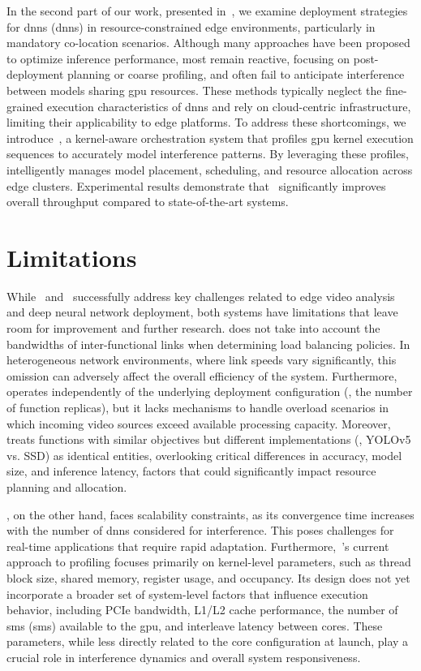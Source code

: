 In the second part of our work, presented in~, we examine deployment strategies for \acrlong{dnn}s (\acrshort{dnn}s) in resource-constrained edge environments, particularly in mandatory co-location scenarios. Although many approaches have been proposed to optimize inference performance, most remain reactive, focusing on post-deployment planning or coarse profiling, and often fail to anticipate interference between models sharing \acrshort{gpu} resources. These methods typically neglect the fine-grained execution characteristics of \acrshort{dnn}s and rely on cloud-centric infrastructure, limiting their applicability to edge platforms. To address these shortcomings, we introduce~\roomie{}, a kernel-aware orchestration system that profiles \acrshort{gpu} kernel execution sequences to accurately model interference patterns. By leveraging these profiles,~\roomie{} intelligently manages model placement, scheduling, and resource allocation across edge clusters. Experimental results demonstrate that~\roomie{} significantly improves overall throughput compared to state-of-the-art systems.

\section{Limitations}

While~\videojam{} and~\roomie{} successfully address key challenges related to edge video analysis and deep neural network deployment, both systems have limitations that leave room for improvement and further research.
\videojam{} does not take into account the bandwidths of inter-functional links when determining load balancing policies. In heterogeneous network environments, where link speeds vary significantly, this omission can adversely affect the overall efficiency of the system. Furthermore,~\videojam{} operates independently of the underlying deployment configuration (\eg, the number of function replicas), but it lacks mechanisms to handle overload scenarios in which incoming video sources exceed available processing capacity. Moreover,~\videojam{} treats functions with similar objectives but different implementations (\eg, YOLOv5 vs. SSD) as identical entities, overlooking critical differences in accuracy, model size, and inference latency, factors that could significantly impact resource planning and allocation.

\roomie{}, on the other hand, faces scalability constraints, as its convergence time increases with the number of \acrshort{dnn}s considered for interference. This poses challenges for real-time applications that require rapid adaptation. Furthermore,~\roomie{}'s current approach to profiling focuses primarily on kernel-level parameters, such as thread block size, shared memory, register usage, and occupancy. Its design does not yet incorporate a broader set of system-level factors that influence execution behavior, including PCIe bandwidth, L1/L2 cache performance, the number of \acrlong{sm}s (\acrshort{sm}s) available to the \acrshort{gpu}, and interleave latency between cores. These parameters, while less directly related to the core configuration at launch, play a crucial role in interference dynamics and overall system responsiveness.

